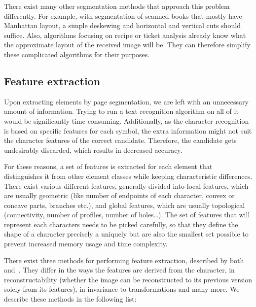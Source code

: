 There exist many other segmentation methods that approach this problem differently. For example, with segmentation of scanned books that mostly have Manhattan layout, a simple deskewing and horizontal and vertical cuts should suffice. Also, algorithms focusing on recipe or ticket analysis already know what the approximate layout of the received image will be. They can therefore simplify these complicated algorithms for their purposes.

\subsection{Feature extraction}

Upon extracting elements by page segmentation, we are left with an unnecessary amount of information. Trying to run a text recognition algorithm on all of it would be significantly time consuming. Additionally, as the character recognition is based on specific features for each symbol, the extra information might not suit the character features of the correct candidate. Therefore, the candidate gets undesirably discarded, which results in decreased accuracy.

For these reasons, a set of features is extracted for each element that distinguishes it from other element classes while keeping characteristic differences. There exist various different features, generally divided into local features, which are usually geometric (like number of endpoints of each character, convex or concave parts, branches etc.), and global features, which are usually topological (connectivity, number of profiles, number of holes\ldots). The set of features that will represent each characters needs to be picked carefully, so that they define the shape of a character precisely a uniquely but are also the smallest set possible to prevent increased memory usage and time complexity.

There exist three methods for performing feature extraction, described by both~\citet{featureExtractionBook} and~\citet{featureExtractiontext}. They differ in the ways the features are derived from the character, in reconstructability (whether the image can be reconstructed to its previous version solely from its features), in invariance to transformations and many more. We describe these methods in the following list:

